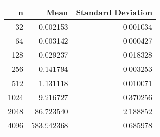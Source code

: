 \begin{tabular}{rrr}
\toprule
    n &        Mean &  Standard Deviation \\
\midrule
   32 &    0.002153 &            0.001034 \\
   64 &    0.003142 &            0.000427 \\
  128 &    0.029237 &            0.018328 \\
  256 &    0.141794 &            0.003253 \\
  512 &    1.131118 &            0.010071 \\
 1024 &    9.216727 &            0.370256 \\
 2048 &   86.723540 &            2.188852 \\
 4096 &  583.942368 &            0.685978 \\
\bottomrule
\end{tabular}
